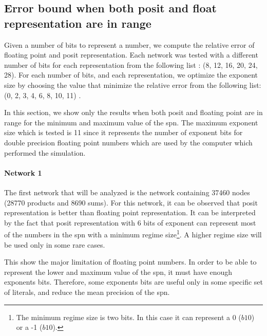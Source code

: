 \subsection{Error bound when both posit and float representation are in range}

Given a number of bits to represent a number, we compute the relative error of floating point and posit representation. Each network was tested with a different number of bits for each representation from the following list : (8, 12, 16, 20, 24, 28). For each number of bits, and each representation, we optimize the exponent size by choosing the value that minimize the relative error from the following list: (0, 2, 3, 4, 6, 8, 10, 11) .

In this section, we show only the results when both posit and floating point are in range for the minimum and maximum value of the \gls{spn}. The maximum exponent size which is tested is 11 since it represents the number of exponent bits for double precision floating point numbers which are used by the computer which performed the simulation.

\paragraph{Network 1}

The first network that will be analyzed is the network containing 37460 nodes (28770 products and 8690 sums). For this network, it can be observed that posit representation is better than floating point representation. It can be interpreted by the fact that posit representation with 6 bits of exponent can represent most of the numbers in the \gls{spn} with a minimum regime size\footnote{The minimum regime size is two bits. In this case it can represent a 0 ($b10$) or a -1 ($b10$).}. A higher regime size will be used only in some rare cases.

This show the major limitation of floating point numbers. In order to be able to represent the lower and maximum value of the \gls{spn}, it must have enough exponents bits. Therefore, some exponents bits are useful only in some specific set of literals, and reduce the mean precision of the \gls{spn}.

